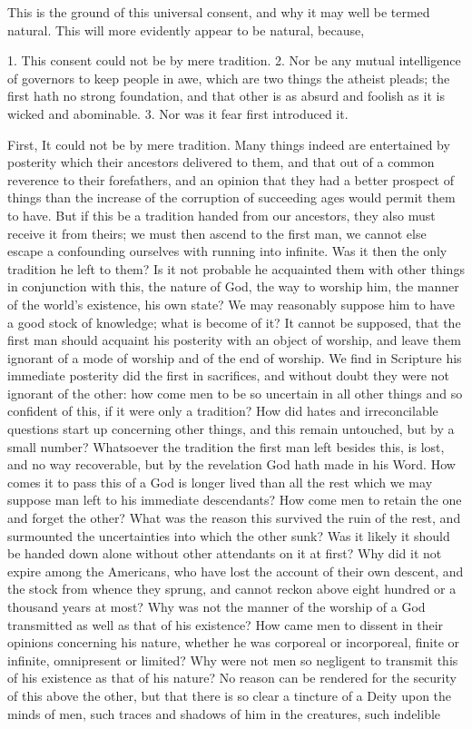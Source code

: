 \documentclass[a5paper]{book}
\begin{document}
This is the ground of this universal consent, 
    and why it may well be termed natural. 
This will more evidently appear to be natural, because,

1. This consent could not be by mere tradition. 
2. Nor be any mutual intelligence of governors to keep people in awe, 
    which are two things the atheist pleads; 
    the first hath no strong foundation,
    and that other is as absurd and foolish 
    as it is wicked and abominable. 
3. Nor was it fear first introduced it.

First, It could not be by mere tradition. Many things indeed are
entertained by posterity which their ancestors delivered to them, and
that out of a common reverence to their forefathers, and an opinion
that they had a better prospect of things than the increase of the
corruption of succeeding ages would permit them to have. But if
this be a tradition handed from our ancestors, they also must receive
it from theirs; we must then ascend to the first man, we cannot
else escape a confounding ourselves with running into infinite. Was
it then the only tradition he left to them? Is it not probable he
acquainted them with other things in conjunction with this, the
nature of God, the way to worship him, the manner of the world’s
existence, his own state? We may reasonably suppose him to have
a good stock of knowledge; what is become of it? It cannot be
supposed, that the first man should acquaint his posterity with an
object of worship, and leave them ignorant of a mode of worship
and of the end of worship. We find in Scripture his immediate
posterity did the first in sacrifices, and without doubt they were not
ignorant of the other: how come men to be so uncertain in all other
things and so confident of this, if it were only a tradition? How
did hates and irreconcilable questions start up concerning other
things, and this remain untouched, but by a small number? 
Whatsoever the tradition the first man left besides this, is lost, and no way
recoverable, but by the revelation God hath made in his Word.
How comes it to pass this of a God is longer lived than all the rest
which we may suppose man left to his immediate descendants? How
come men to retain the one and forget the other? What was the
reason this survived the ruin of the rest, and surmounted the 
uncertainties into which the other sunk? Was it likely it should be
handed down alone without other attendants on it at first? Why
did it not expire among the Americans, who have lost the account
of their own descent, and the stock from whence they sprung, and
cannot reckon above eight hundred or a thousand years at most?
Why was not the manner of the worship of a God transmitted as
well as that of his existence? How came men to dissent in their
opinions concerning his nature, whether he was corporeal or 
incorporeal, finite or infinite, omnipresent or limited? Why were not men
so negligent to transmit this of his existence as that of his nature?
No reason can be rendered for the security of this above the other,
but that there is so clear a tincture of a Deity upon the minds of
men, such traces and shadows of him in the creatures, such indelible
\end{document}
